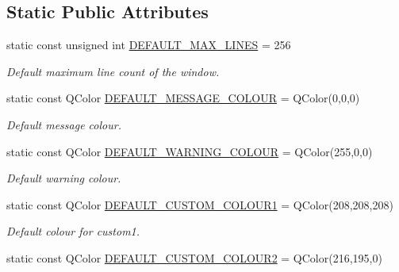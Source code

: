 \subsection*{Static Public Attributes}
\begin{DoxyCompactItemize}
\item 
\hypertarget{class_console_widget_af215d1c2ed6a4b8891528dd0cdbc4585}{static const unsigned int \hyperlink{class_console_widget_af215d1c2ed6a4b8891528dd0cdbc4585}{D\-E\-F\-A\-U\-L\-T\-\_\-\-M\-A\-X\-\_\-\-L\-I\-N\-E\-S} = 256}\label{class_console_widget_af215d1c2ed6a4b8891528dd0cdbc4585}

\begin{DoxyCompactList}\small\item\em Default maximum line count of the window. \end{DoxyCompactList}\item 
\hypertarget{class_console_widget_a1b1a4275424776cca6958cc5afd3c2d1}{static const Q\-Color \hyperlink{class_console_widget_a1b1a4275424776cca6958cc5afd3c2d1}{D\-E\-F\-A\-U\-L\-T\-\_\-\-M\-E\-S\-S\-A\-G\-E\-\_\-\-C\-O\-L\-O\-U\-R} = Q\-Color(0,0,0)}\label{class_console_widget_a1b1a4275424776cca6958cc5afd3c2d1}

\begin{DoxyCompactList}\small\item\em Default message colour. \end{DoxyCompactList}\item 
\hypertarget{class_console_widget_ab73a773298b4822640c9a64c9f75b8a8}{static const Q\-Color \hyperlink{class_console_widget_ab73a773298b4822640c9a64c9f75b8a8}{D\-E\-F\-A\-U\-L\-T\-\_\-\-W\-A\-R\-N\-I\-N\-G\-\_\-\-C\-O\-L\-O\-U\-R} = Q\-Color(255,0,0)}\label{class_console_widget_ab73a773298b4822640c9a64c9f75b8a8}

\begin{DoxyCompactList}\small\item\em Default warning colour. \end{DoxyCompactList}\item 
\hypertarget{class_console_widget_abbd61319fc0c7feeb51623498eddeb9a}{static const Q\-Color \hyperlink{class_console_widget_abbd61319fc0c7feeb51623498eddeb9a}{D\-E\-F\-A\-U\-L\-T\-\_\-\-C\-U\-S\-T\-O\-M\-\_\-\-C\-O\-L\-O\-U\-R1} = Q\-Color(208,208,208)}\label{class_console_widget_abbd61319fc0c7feeb51623498eddeb9a}

\begin{DoxyCompactList}\small\item\em Default colour for custom1. \end{DoxyCompactList}\item 
\hypertarget{class_console_widget_a07ff3055aa08dd9d86531db2838e086a}{static const Q\-Color \hyperlink{class_console_widget_a07ff3055aa08dd9d86531db2838e086a}{D\-E\-F\-A\-U\-L\-T\-\_\-\-C\-U\-S\-T\-O\-M\-\_\-\-C\-O\-L\-O\-U\-R2} = Q\-Color(216,195,0)}\label{class_console_widget_a07ff3055aa08dd9d86531db2838e086a}


\end{DoxyCompactItemize}
